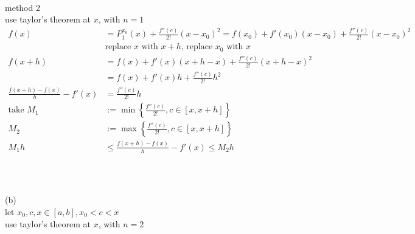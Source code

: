 \documentclass[12pt, border = 4pt, multi]{article} %
\begin{document}
\\
\\
\\
method 2\\
use taylor's theorem at $x$, with $n = 1$
\begin{align*}
f(x) &= P_1 ^ {x_0}(x) + \frac{f''(c)}{2!}(x - x_0) ^ 2 = f(x_0) + f'(x_0)(x - x_0) + \frac{f''(c)}{2!}(x - x_0) ^ 2\\
&\text{replace $x$ with $x + h$, replace $x_0$ with $x$}\\
f(x + h) &= f(x) + f'(x)(x + h - x) + \frac{f''(c)}{2!}(x + h - x) ^ 2\\
&= f(x) + f'(x)h + \frac{f''(c)}{2!}h ^ 2\\
\frac{f(x + h) - f(x)}{h} - f'(x) &= \frac{f''(c)}{2!}h\\
\text{take } M_1 &:= \min\left\{\frac{f''(c)}{2!}, c \in [x, x + h]\right\}\\
M_2 &:= \max\left\{\frac{f''(c)}{2!}, c \in [x, x + h]\right\}\\
M_1 h &\leq \frac{f(x + h) - f(x)}{h} - f'(x) \leq M_2 h\\
\end{align*}
\\
\\
\\
(b)\\
let $x_0, c, x \in [a, b], x_0 < c < x$\\
use taylor's theorem at $x$, with $n = 2$
\end{document}
